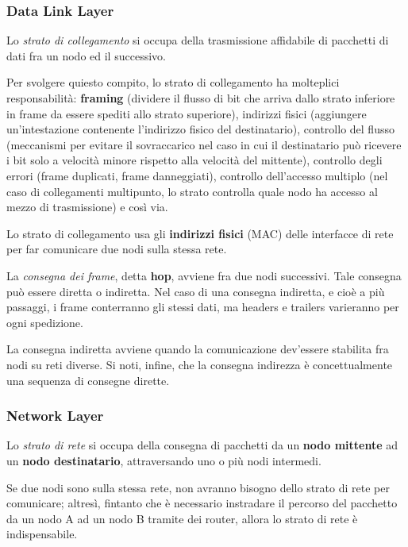 \subsubsection{Data Link Layer}

Lo \textit{strato di collegamento} si occupa della trasmissione affidabile di pacchetti di dati fra un nodo ed il successivo. 

\vspace{3mm}

Per svolgere quiesto compito, lo strato di collegamento ha molteplici responsabilità: \textbf{framing} (dividere il flusso di bit che arriva dallo strato inferiore in frame da essere spediti allo strato superiore), indirizzi fisici (aggiungere un'intestazione contenente l'indirizzo fisico del destinatario), controllo del flusso (meccanismi per evitare il sovraccarico nel caso in cui il destinatario può ricevere i bit solo a velocità minore rispetto alla velocità del mittente), controllo degli errori (frame duplicati, frame danneggiati), controllo dell'accesso multiplo (nel caso di collegamenti multipunto, lo strato controlla quale nodo ha accesso al mezzo di trasmissione) e così via.

\vspace{3mm}

Lo strato di collegamento usa gli \textbf{indirizzi fisici} (MAC) delle interfacce di rete per far comunicare due nodi sulla stessa rete.

\vspace{3mm}

La \textit{consegna dei frame}, detta \textbf{hop}, avviene fra due nodi successivi. Tale consegna può essere diretta o indiretta. Nel caso di una consegna indiretta, e cioè a più passaggi, i frame conterranno gli stessi dati, ma headers e trailers varieranno per ogni spedizione. 

La consegna indiretta avviene quando la comunicazione dev'essere stabilita fra nodi su reti diverse. Si noti, infine, che la consegna indirezza è concettualmente una sequenza di consegne dirette.

\subsubsection{Network Layer}

Lo \textit{strato di rete} si occupa della consegna di pacchetti da un \textbf{nodo mittente} ad un \textbf{nodo destinatario}, attraversando uno o più nodi intermedi. 

Se due nodi sono sulla stessa rete, non avranno bisogno dello strato di rete per comunicare; altresì, fintanto che è necessario instradare il percorso del pacchetto da un nodo A ad un nodo B tramite dei router, allora lo strato di rete è indispensabile.

